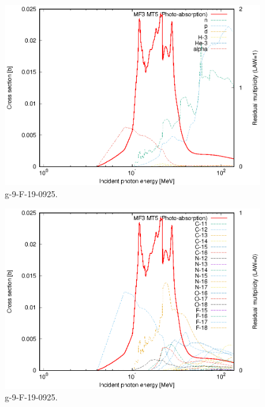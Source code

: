 \begin{figure}
 \includegraphics[width=\linewidth]{eps/g_9-F-19_0925.eps}
  \caption{g-9-F-19-0925.}
\end{figure}
\begin{figure}
 \includegraphics[width=\linewidth]{eps-law0/g_9-F-19_0925.eps}
 \caption{g-9-F-19-0925.}
\end{figure}
\newpage \clearpage

